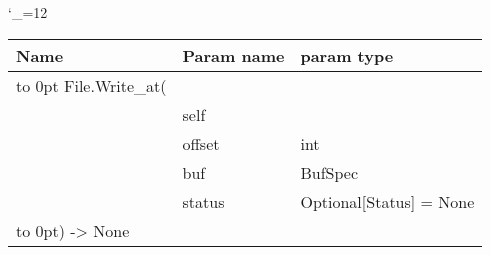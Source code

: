 \begingroup \catcode`\_=12 \tt
\begin{tabular}{lll}
\toprule
\textrm{Name}&\textrm{Param name}&\textrm{param type}\\
\midrule
\hbox to 0pt {File.Write_at(\hss}\\
& self\\
& offset & int\\
& buf & BufSpec\\
& status & Optional[Status] = None\\
\hbox to 0pt{) -> None\hss}\\
\bottomrule
\end{tabular}
\endgroup
